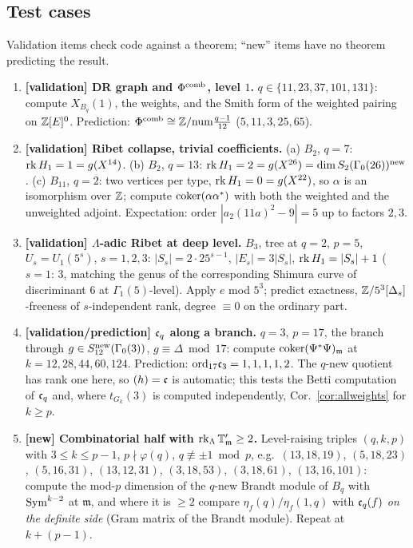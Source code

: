 \documentclass[11pt]{amsart}
\theoremstyle{plain}
\theoremstyle{definition}
\theoremstyle{remark}
\newcommand{\T}{\mathbb{T}}\newcommand{\m}{\mathfrak{m}}\newcommand{\cT}{\mathcal{T}}\newcommand{\cX}{\mathcal{X}}
\begin{document}
\subsection{Test cases}\label{ss:tests}
Validation items check code against a theorem; ``new'' items have no theorem predicting the result.
\begin{enumerate}[label=\textbf{T\arabic*}]
\item \textbf{[validation] DR graph and $\Phi^{\rm comb}$, level $1$.} $q\in\{11,23,37,101,131\}$: compute $X_{B_q}(1)$, the weights, and the Smith form of the weighted pairing on $\mathbb{Z}[E]^0$. Prediction: $\Phi^{\rm comb}\cong\mathbb{Z}/\mathrm{num}\frac{q-1}{12}$ ($5,11,3,25,65$).
\item \textbf{[validation] Ribet collapse, trivial coefficients.} (a) $B_2$, $q=7$: $\operatorname{rk} H_1=1=g(X^{14})$. (b) $B_2$, $q=13$: $\operatorname{rk} H_1=2=g(X^{26})=\dim S_2(\Gamma_0(26))^{\rm new}$. (c) $B_{11}$, $q=2$: two vertices per type, $\operatorname{rk} H_1=0=g(X^{22})$, so $\alpha$ is an isomorphism over $\mathbb{Z}$; compute $\operatorname{coker}(\alpha\alpha^*)$ with both the weighted and the unweighted adjoint. Expectation: order $|a_2(11a)^2-9|=5$ up to factors $2,3$.
\item \textbf{[validation] $\Lambda$-adic Ribet at deep level.} $B_3$, tree at $q=2$, $p=5$, $U_s=U_1(5^s)$, $s=1,2,3$: $|S_s|=2\cdot25^{s-1}$, $|E_s|=3|S_s|$, $\operatorname{rk} H_1=|S_s|+1$ ($s=1$: $3$, matching the genus of the corresponding Shimura curve of discriminant $6$ at $\Gamma_1(5)$-level). Apply $e$ mod $5^3$; predict exactness, $\mathbb{Z}/5^3[\Delta_s]$-freeness of $s$-independent rank, degree $\equiv0$ on the ordinary part.
\item \textbf{[validation/prediction] $\mathfrak{c}_q$ along a branch.} $q=3$, $p=17$, the branch through $g\in S_{12}^{\rm new}(\Gamma_0(3))$, $g\equiv\Delta\bmod17$: compute $\coker(\Psi^*\Psi)_\m$ at $k=12,28,44,60,124$. Prediction: $\mathrm{ord}_{17}\mathfrak{c}_3=1,1,1,1,2$. The $q$-new quotient has rank one here, so $(h)=\mathfrak{c}$ is automatic; this tests the Betti computation of $\mathfrak{c}_q$ and, where $t_{G_k}(3)$ is computed independently, Cor.~\ref{cor:allweights} for $k\ge p$.
\item \textbf{[new] Combinatorial half with $\rk_\Lambda\T'_\m\ge2$.} Level-raising triples $(q,k,p)$ with $3\le k\le p-1$, $p\nmid\varphi(q)$, $q\not\equiv\pm1\bmod p$, e.g.\ $(13,18,19)$, $(5,18,23)$, $(5,16,31)$, $(13,12,31)$, $(3,18,53)$, $(3,18,61)$, $(13,16,101)$: compute the mod-$p$ dimension of the $q$-new Brandt module of $B_q$ with $\mathrm{Sym}^{k-2}$ at $\m$, and where it is $\ge2$ compare $\eta_f(q)/\eta_f(1,q)$ with $\mathfrak{c}_q(f)$ \emph{on the definite side} (Gram matrix of the Brandt module). Repeat at $k+(p-1)$.

\end{enumerate}
\end{document}
